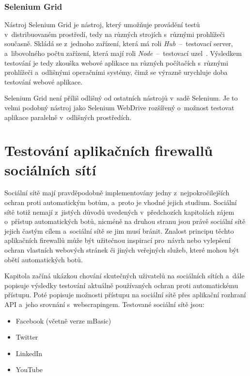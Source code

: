 \subsection*{Selenium Grid}
Nástroj Selenium Grid je nástroj, který umožňuje provádění testů v~distribuovaném prostředí, tedy na různých strojích s~různými prohlížeči současně. Skládá se z~jednoho zařízení, která má roli \textit{Hub}~--~testovací server, a~libovolného počtu zařízení, která mají roli \textit{Node}~--~testovací uzel~\cite{bib:selenium_grid}. Výsledkem testování je tedy zkouška webové aplikace na různých počítačích s~různými prohlížeči a~odlišnými operačními systémy, čimž se výrazně urychluje doba testování webové aplikace.

Selenium Grid není příliš odlišný od ostatních nástrojů v~sadě Selenium. Je to velmi podobný nástroj jako Selenium WebDrive rozšířený o~možnost testovat aplikace paralelně v~odlišných prostředích.

\chapter{Testování aplikačních firewallů sociálních sítí}
\label{chap:app_firewalls_tests}
Sociální sítě mají pravděpodobně implementovány jedny z~nejpokročilejších ochran proti automatickým botům, a~proto je vhodné jejich studium. Sociální sítě totiž nemají z~jistých důvodů uvedených v~předchozích kapitolách zájem o~přístup automatických botů, nicméně na druhou stranu jsou právě sociální sítě jejich častým cílem a~sociální sítě se jim musí bránit. Znalost principu těchto aplikačních firewallů může být užitečnou inspirací pro~návrh nebo vylepšení ochran vlastních webových stránek či jiných veřejných služeb, které mohou být obětí automatických botů.

Kapitola začíná ukázkou chování skutečných uživatelů na sociálních sítích a~dále popisuje výsledky testování aktuálně používaných ochran proti automatickému přístupu. Poté popisuje možnosti přístupu na sociální sítě přes aplikační rozhraní API a~jeho srovnání s~webscrapingem. Testované sociální sítě jsou:

\begin{itemize}
  \item Facebook (včetně verze mBasic)
  \item Twitter
  \item LinkedIn
  \item YouTube
\end{itemize}

